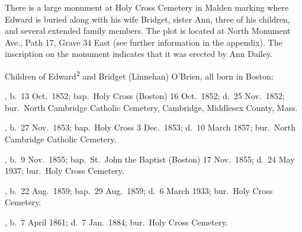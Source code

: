There is a large monument at Holy Cross Cemetery in Malden marking where Edward is buried along with his wife Bridget, sister Ann, three of his children, and several extended family members. The plot is located at North Monument Ave., Path 17, Grave 34 East (see further information in the appendix).\cite{Edward2OBrienGrave,CarolGordon:4} The inscription on the monument indicates that it was erected by Ann Dailey.\cite{AnnDaileyMonument}

\begin{KidsIntro}
	Children of Edward\textsuperscript{2} and Bridget (Linnehan) O'Brien, all born in Boston:
\end{KidsIntro}

\begin{Kids}
	, b.\ 13 Oct.\ 1852;\cite{MaryAnn3OBrienBirth:2} bap.\ Holy Cross (Boston) 16 Oct.\ 1852;\cite{MaryAnn3OBrienBaptism} d.\ 25 Nov.\ 1852;\cite{MaryAnn3OBrienDeath} bur.\ North Cambridge Catholic Cemetery, Cambridge, Middlesex County, Mass.\cite{DianaBerberenaLetter1:2}
	
	, b.\ 27 Nov.\ 1853;\cite{Ellen3OBrienBirth} bap.\ Holy Cross 3 Dec.\ 1853;\cite{Ellen3OBrienBaptism} d.\ 10 March 1857;\cite{Ellen3OBrienDeath} bur.\ North Cambridge Catholic Cemetery.\cite{DianaBerberenaLetter2:1}
	
	, b.\ 9 Nov.\ 1855;\cite{AnnMaria3OBrienBirth} bap.\ St.\ John the Baptist (Boston) 17 Nov.\ 1855\cite{AnnMaria3OBrienBaptism}; d.\ 24 May 1937;\cite{AnnMaria3OBrienDeath:2} bur.\ Holy Cross Cemetery.\cite{CarolGordon:5}
	
	, b.\ 22 Aug.\ 1859;\cite{Margaret3OBrien2Baptism:1} bap.\ 29 Aug.\ 1859;\cite{Margaret3OBrien2Baptism:2} d.\ 6 March 1933;\cite{Margaret3OBrien2Death:2} bur.\ Holy Cross Cemetery.\cite{CarolGordon:6}
	
	, b.\ 7 April 1861;\cite{Edward3OBrienBirth:2} d.\ 7 Jan.\ 1884;\cite{Edward3OBrienDeath} bur.\ Holy Cross Cemetery.\cite{CarolGordon:7}
\end{Kids}